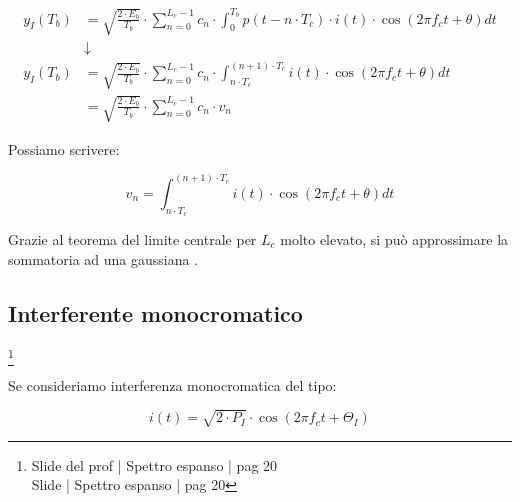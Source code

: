 {
    \Large 
    \begin{equation}
        \begin{split}
        y_I (T_b)
        &=
        \sqrt{\frac{2 \cdot E_b}{T_b}}
            \cdot
            \sum_{n = 0}^{L_c - 1}
            c_n
            \cdot 
            \int_{0}^{T_b}
            p(t - n \cdot T_c)
            \cdot 
            i(t)
            \cdot 
            \cos(2 \pi f_c t + \theta)
            dt
        \\
        &\downarrow
        \\
        y_I (T_b)
        &=
        \sqrt{\frac{2 \cdot E_b}{T_b}}
            \cdot
            \sum_{n = 0}^{L_c - 1}
            c_n
            \cdot 
            \int_{n \cdot T_c}^{(n+1) \cdot T_c}
            i(t)
            \cdot 
            \cos(2 \pi f_c t + \theta)
            dt
            \\
            &= 
              \sqrt{\frac{2 \cdot E_b}{T_b}}
            \cdot
            \sum_{n = 0}^{L_c - 1}
            c_n
            \cdot
            v_n
        \end{split}
    \end{equation}
}

Possiamo scrivere: 

{
    \Large 
    \begin{equation}
        v_n = 
        \int_{n \cdot T_c}^{(n+1) \cdot T_c}
            i(t)
            \cdot 
            \cos(2 \pi f_c t + \theta)
            dt
    \end{equation}
}

Grazie al teorema del limite centrale per $L_c$ molto elevato, 
si può approssimare la sommatoria ad una gaussiana . \newline 

\newpage 

\subsection{Interferente monocromatico}
\footnote{Slide del prof | Spettro espanso | pag 20 \\
Slide | Spettro espanso | pag 20 
} 

Se consideriamo interferenza monocromatica del tipo:

{
    \Large 
    \begin{equation}
        i (t)
        = 
        \sqrt{2 \cdot P_I}
        \cdot 
        \cos(2 \pi f_c t + \varTheta_I )
    \end{equation}
}

